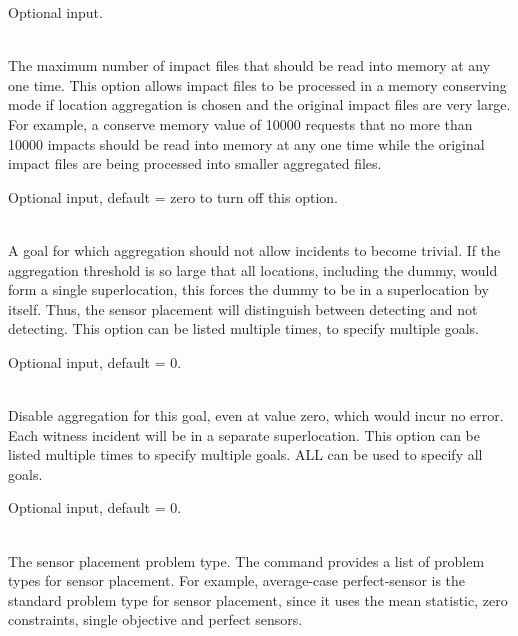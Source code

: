 \begin{description}[topsep=0pt,parsep=0.5em,itemsep=-0.4em]
\begin{description}[topsep=0pt,parsep=0.5em,itemsep=-0.4em]
                Optional input.
    \item[{conserve memory}]\hfill
\\The maximum number of impact files that should be read into memory 
                at any one time. This option allows impact files to be processed in 
                a memory conserving mode if location aggregation is chosen and the original impact
                files are very large. For example, a conserve memory value of 10000 requests
                that no more than 10000 impacts should be read into memory at any one 
                time while the original impact files are being processed into smaller
                aggregated files.  
				
				Optional input, default = zero to turn off this option.
    \item[{distinguish detection}]\hfill
\\A goal for which aggregation should not allow incidents to
                become trivial. If the aggregation threshold is so large that all
                locations, including the dummy, would form a single superlocation,
                this forces the dummy to be in a superlocation by itself. Thus,
                the sensor placement will distinguish between detecting and not
                detecting. This option can be listed multiple times, to specify
                multiple goals. 
                
                Optional input, default = 0.
    \item[{disable aggregation}]\hfill
\\Disable aggregation for this goal, even at value zero, which
                would incur no error. Each witness incident will be in a separate
                superlocation. This option can be listed multiple times to
                specify multiple goals. ALL can be used to specify
                all goals. 
                
                Optional input, default = 0.
  \end{description}
  \item[{sensor placement}]\hfill
  \begin{description}[topsep=0pt,parsep=0.5em,itemsep=-0.4em]
    \item[{type}]\hfill
\\The sensor placement problem type. The command  
                provides a list of problem types for sensor placement. For example, average-case perfect-sensor
                is the standard problem type for sensor placement, since it uses the mean statistic, 
                zero constraints, single objective and perfect sensors. 
                

\end{description}
\end{description}
